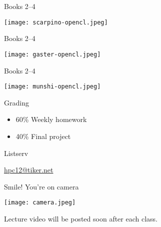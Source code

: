 \documentclass[english,compress]{beamer}
\begin{document}
\begin{frame}{Books 2--4}
  \begin{center}
    \texttt{[image: scarpino-opencl.jpeg]}
  \end{center}
\end{frame}
\begin{frame}{Books 2--4}
  \begin{center}
    \texttt{[image: gaster-opencl.jpeg]}
  \end{center}
\end{frame}
\begin{frame}{Books 2--4}
  \begin{center}
    \texttt{[image: munshi-opencl.jpeg]}
  \end{center}
\end{frame}
\begin{frame}{Grading}
  \Large
  \begin{itemize}
    \item 60\% Weekly homework
    \item 40\% Final project
  \end{itemize}
\end{frame}
\begin{frame}{Listserv}
  \begin{center}
    \Huge
    \href{mailto:hpc12@tiker.net}{hpc12@tiker.net}
  \end{center}
\end{frame}
\begin{frame}{Smile! You're on camera}
  \begin{center}
    \texttt{[image: camera.jpeg]}

    Lecture video will be posted soon after each class.
  \end{center}
\end{frame}
\end{document}
